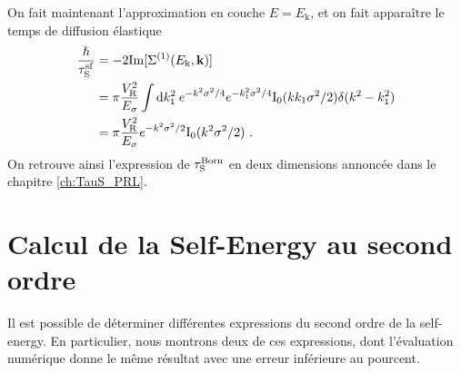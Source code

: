On fait maintenant l'approximation en couche $E=E_{\mathrm{k}}$, et on fait apparaître le temps de diffusion élastique
\begin{align}
\frac{\hslash}{\tau_{\mathrm{S}}^{\mathrm{sf}}}&=-2\mathrm{Im}[\Sigma^{(1)}(E_{\mathrm{k}},\mathbf{k})] \\
&= \pi \frac{V_{\mathrm{R}}^2}{E_{\sigma}} \int{\mathop{}\mathopen{}\mathrm{d}k_{\mathrm{1}}^2 \: e^{-k^2\sigma^2 /4} e^{-k_{\mathrm{1}}^2\sigma^2/4} \mathrm{I_0}(k k_{\mathrm{1}} \sigma^2 /2) \delta(k^2-k_{\mathrm{1}}^2)} \\
&= \pi \frac{V_{\mathrm{R}}^2}{E_{\sigma}} e^{-k^2\sigma^2/2} \mathrm{I_0}(k^2\sigma^2/2) \text{ .}
\end{align}
On retrouve ainsi l'expression de $\tau_{\mathrm{S}}^{\mathrm{Born}}$ en deux dimensions annoncée dans le chapitre \ref{ch:TauS_PRL}.






\section{Calcul de la Self-Energy au second ordre}
Il est possible de déterminer différentes expressions du second ordre de la self-energy. En particulier, nous montrons deux de ces expressions, dont l'évaluation numérique donne le même résultat avec une erreur inférieure au pourcent. 


